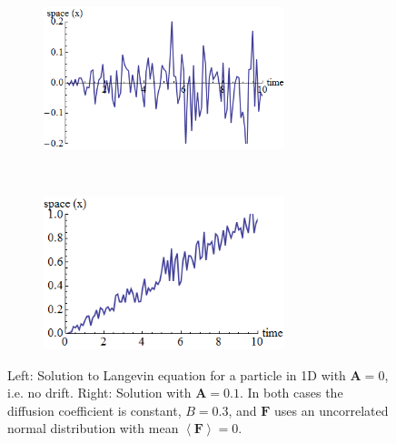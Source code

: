 \documentclass[11pt, onecolumn, compsoc, letterpaper]{article}
\newcommand{\V}[1]{\mathbf{#1}}
\begin{document}
\begin{figure}[!htb]
\centering\begin{subfigure}{.5\textwidth}
\centering\includegraphics[width=7cm]{../assets/LanNoDrift.png}
\end{subfigure}~
\centering\begin{subfigure}{.5\textwidth}
\centering\includegraphics[width=7cm]{../assets/LanDrift.png}
\end{subfigure}
\caption{Left: Solution to Langevin equation for a particle in 1D with $\V{A} = 0$, i.e. no drift. Right: Solution with $\V{A} = 0.1$. In both cases the diffusion coefficient is constant, $B = 0.3$, and $\V{F}$ uses an uncorrelated normal distribution with mean $\left<\V{F}\right> = 0$.}\label{fig:lan}
\end{figure}
\end{document}
